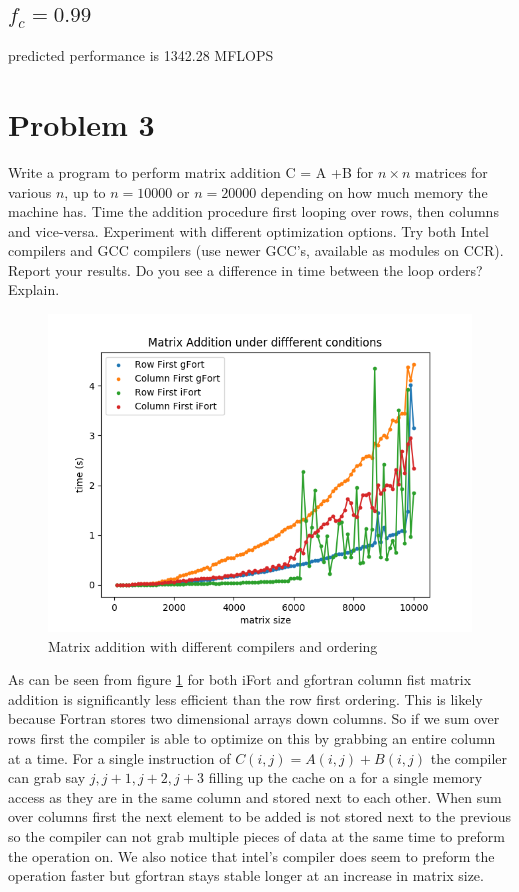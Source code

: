 \documentclass[12pt]{article}
\theoremstyle{plain}
\theoremstyle{definition}
\begin{document}
\subsection{$f_c = 0.99$}
predicted performance is 1342.28 MFLOPS

\section*{Problem 3}
Write a program to perform matrix addition C = A +B for $n \times n$ matrices for various $n$,
up to $n = 10000$ or $n = 20000$ depending on how much memory the machine has. Time
the addition procedure first looping over rows, then columns and vice-versa. Experiment
with different optimization options. Try both Intel compilers and GCC compilers (use
newer GCC’s, available as modules on CCR). Report your results. Do you see a difference
in time between the loop orders? Explain.

\begin{figure}
\label{fig:problem3}
\includegraphics[scale=0.7]{problem3.png}
\caption{Matrix addition with different compilers and ordering}
\end{figure}

As can be seen from figure \ref{fig:problem3} for both iFort and gfortran  column fist matrix addition is significantly less efficient than the row first ordering. This is likely because Fortran stores two dimensional arrays down columns. So if we sum over rows first the compiler is able to optimize on this by grabbing an entire column at a time. For a single instruction of $C(i,j) = A(i,j) + B(i,j)$ the compiler can grab say $j,j+1,j+2,j+3$ filling up the cache on a for a single memory access as they are in the same column and stored next to each other. When sum over columns first the next element to be added is not stored next to the previous so the compiler can not grab multiple pieces of data at the same time to preform the operation on. We also notice that intel's compiler does seem to preform the operation faster but gfortran stays stable longer at an increase in matrix size.
\end{document}
